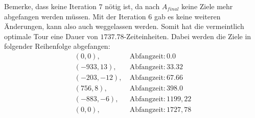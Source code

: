 \documentclass[german,version-2019-11]{uzl-thesis}
\begin{document}
Bemerke, dass keine Iteration $7$ nötig ist, da nach $A_{final}$ keine Ziele mehr abgefangen werden müssen. Mit der Iteration $6$ gab es keine weiteren Änderungen, kann also auch weggelassen werden. Somit hat die vermeintlich optimale Tour eine Dauer von $1737.78$-Zeiteinheiten. Dabei werden die Ziele in folgender Reihenfolge abgefangen:
\begin{align*}
(0,0),~ &\text{Abfangzeit}: 0.0 \\
(-933, 13),~ &\text{Abfangzeit}: 33.32 \\
(-203, -12),~ &\text{Abfangzeit}: 67.66 \\
(756, 8),~ &\text{Abfangzeit}: 398.0 \\
(-883, -6),~ &\text{Abfangzeit}: 1199,22 \\
(0, 0),~ &\text{Abfangzeit}: 1727,78 
\end{align*}
\end{document}

